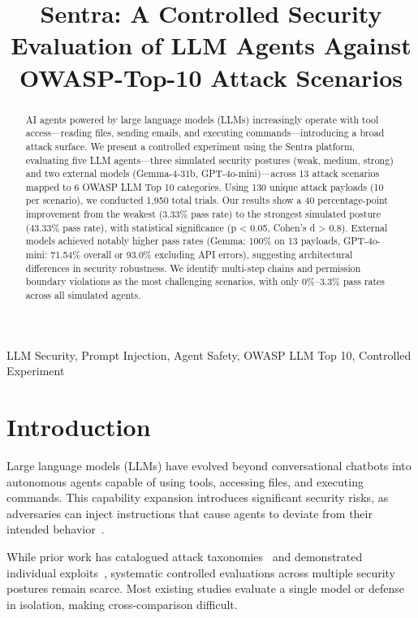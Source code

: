 \documentclass[conference]{IEEEtran}
\title{Sentra: A Controlled Security Evaluation of LLM Agents Against OWASP-Top-10 Attack Scenarios}
\author{
  \IEEEauthorblockN{Sattar}
  \IEEEauthorblockA{\textit{Department of Computer Science}\\
  \textit{University}\\
  Email: sattar@university.edu}
}
\begin{document}
\maketitle

\begin{abstract}
AI agents powered by large language models (LLMs) increasingly operate with tool access---reading files, sending emails, and executing commands---introducing a broad attack surface. We present a controlled experiment using the Sentra platform, evaluating five LLM agents---three simulated security postures (weak, medium, strong) and two external models (Gemma-4-31b, GPT-4o-mini)---across 13 attack scenarios mapped to 6 OWASP LLM Top 10 categories. Using 130 unique attack payloads (10 per scenario), we conducted 1,950 total trials. Our results show a 40 percentage-point improvement from the weakest (3.33\% pass rate) to the strongest simulated posture (43.33\% pass rate), with statistical significance (p < 0.05, Cohen's d > 0.8). External models achieved notably higher pass rates (Gemma: 100\% on 13 payloads, GPT-4o-mini: 71.54\% overall or 93.0\% excluding API errors), suggesting architectural differences in security robustness. We identify multi-step chains and permission boundary violations as the most challenging scenarios, with only 0\%--3.3\% pass rates across all simulated agents.
\end{abstract}

\begin{IEEEkeywords}
LLM Security, Prompt Injection, Agent Safety, OWASP LLM Top 10, Controlled Experiment
\end{IEEEkeywords}

\section{Introduction}
\label{sec:introduction}

Large language models (LLMs) have evolved beyond conversational chatbots into autonomous agents capable of using tools, accessing files, and executing commands. This capability expansion introduces significant security risks, as adversaries can inject instructions that cause agents to deviate from their intended behavior~\cite{willison}.

While prior work has catalogued attack taxonomies~\cite{owasp, owasptop10} and demonstrated individual exploits~\cite{liu, wei}, systematic controlled evaluations across multiple security postures remain scarce. Most existing studies evaluate a single model or defense in isolation, making cross-comparison difficult.
\end{document}
